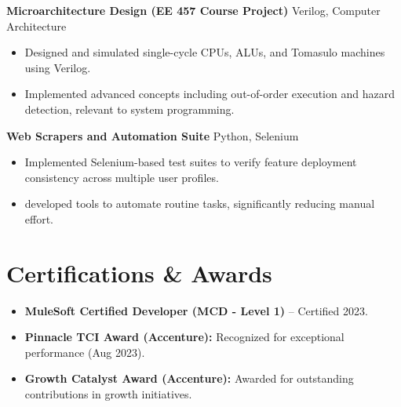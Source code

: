 \documentclass[letterpaper,10pt]{article}
\begin{document}
\textbf{Microarchitecture Design (EE 457 Course Project)} \hfill Verilog, Computer Architecture \\
\begin{itemize}
    \item Designed and simulated single-cycle CPUs, ALUs, and Tomasulo machines using Verilog.
    \item Implemented advanced concepts including out-of-order execution and hazard detection, relevant to system programming.
\end{itemize}

\textbf{Web Scrapers and Automation Suite} \hfill Python, Selenium \\
\begin{itemize}
    \item Implemented Selenium-based test suites to verify feature deployment consistency across multiple user profiles.
    \item developed tools to automate routine tasks, significantly reducing manual effort.
\end{itemize}



\section*{Certifications \& Awards}
\begin{itemize} \itemsep -2pt
    \item \textbf{MuleSoft Certified Developer (MCD - Level 1)} -- Certified 2023.
    \item \textbf{Pinnacle TCI Award (Accenture):} Recognized for exceptional performance (Aug 2023).
    \item \textbf{Growth Catalyst Award (Accenture):} Awarded for outstanding contributions in growth initiatives.
\end{itemize}
\end{document}
